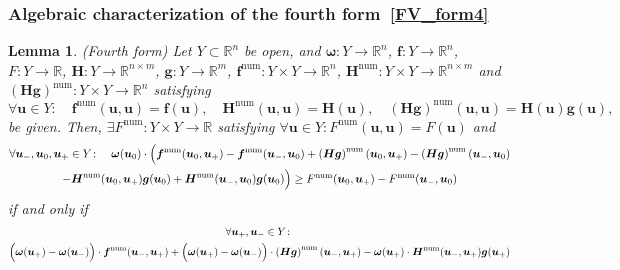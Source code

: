 \documentclass[]{scrartcl}
\renewcommand{\vec}[1]{\boldsymbol{#1}}
\newtheorem{lemma}[theorem]{Lemma}
\theoremstyle{definition}
\begin{document}
\subsubsection{Algebraic characterization of the fourth form\texorpdfstring{~\eqref{FV_form4}}{}}

\begin{lemma}{\label{algebraic_lemma_nc_form4}(Fourth form)}
Let $Y \subset \mathbb{R}^n$ be open, and $\vec{\omega}\colon Y \to \mathbb{R}^n$, $\vec{f}\colon Y \to \mathbb{R}^n$, $F\colon Y \to \mathbb{R}$, $\vec{H}\colon Y \to \mathbb{R}^{n \times m}$, $\vec{g}\colon Y \to \mathbb{R}^m$, $\vec{f}^{\mathrm{num}}\colon Y \times Y \to \mathbb{R}^n$, $\vec{H}^{\mathrm{num}}\colon Y \times Y \to \mathbb{R}^{n \times m}$ and $(\vec{H} \vec{g})^{\mathrm{num}}\colon Y \times Y \to \mathbb{R}^n$ satisfying
\begin{equation}
\forall \vec{u} \in Y\colon \quad \vec{f}^\mathrm{num}(\vec{u},\vec{u}) = \vec{f}(\vec{u}), \quad \vec{H}^\mathrm{num}(\vec{u},\vec{u}) = \vec{H}(\vec{u}), \quad (\vec{H} \vec{g})^\mathrm{num}(\vec{u},\vec{u}) = \vec{H}(\vec{u}) \vec{g}(\vec{u}),
\end{equation}
be given. Then,
$\exists F^\mathrm{num}\colon Y \times Y \to \mathbb{R}$ satisfying $\forall \vec{u}\in Y\colon F^\mathrm{num}(\vec{u},\vec{u}) = F(\vec{u})$ and
\begin{multline}
    \forall \vec{u}_-, \vec{u}_0, \vec{u}_+ \in Y\colon \quad \vec{\omega}(\vec{u}_0) \cdot \Bigl (  \vec{f}^\mathrm{num}(\vec{u}_0, \vec{u}_+) - \vec{f}^\mathrm{num}(\vec{u}_-, \vec{u}_0) + \left ( \vec{H}\vec{g}\right )^\mathrm{num}(\vec{u}_0, \vec{u}_+) - \left (\vec{H}\vec{g}\right )^\mathrm{num}(\vec{u}_-, \vec{u}_0) \\- \vec{H}^{\mathrm{num}}(\vec{u}_0, \vec{u}_+)\vec{g}(\vec{u}_0) + \vec{H}^\mathrm{num}(\vec{u}_-,\vec{u}_0)\vec{g}(\vec{u}_0)  \Bigr ) \geq F^\mathrm{num}(\vec{u}_0, \vec{u}_+) - F^\mathrm{num}(\vec{u}_-, \vec{u}_0)
    \label{sufficient_condition_form4}
\end{multline}
if and only if
\begin{multline}
    \forall \vec{u}_+, \vec{u}_- \in Y\colon
    \\
    \Bigl (\vec{\omega}(\vec{u}_+) - \vec{\omega}(\vec{u}_-) \Bigr )
    \cdot \vec{f}^\mathrm{num}(\vec{u}_-, \vec{u}_+)
    + \Bigl (\vec{\omega}(\vec{u}_+) - \vec{\omega}(\vec{u}_-)  \Bigr ) \cdot \left ( \vec{H}\vec{g} \right )^{\mathrm{num}}(\vec{u}_-, \vec{u}_+)
    - \vec{\omega}(\vec{u}_+) \cdot \vec{H}^{\mathrm{num}}(\vec{u}_-, \vec{u}_+)  \vec{g}(\vec{u}_+)

\end{multline}
\end{lemma}
\end{document}

